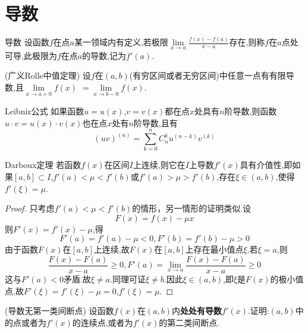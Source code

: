 \chapter{导数}

\begin{theorem}{导数} \label{thm:derivative}
	设函数$f$在点$a$某一领域内有定义,若极限$\lim\limits_{x\rightarrow a}\frac{f\left( x \right) -f\left( a \right)}{x-a}$存在,则称$f$在$a$点处可导,此极限为$f$在点$a$的导数,记为$f'\left( a \right) $.
\end{theorem}

\begin{example}{}
(广义Rolle中值定理) 设$f$在$\left( a,b \right) $(有穷区间或者无穷区间)中任意一点有有限导数,且$\lim\limits_{x\rightarrow a+0}f\left( x \right) $ $=\lim\limits_{x\rightarrow b-0}f\left( x \right) $.
\end{example}

\vspace{7cm}

\begin{theorem}{Leibniz公式} \label{thm:Leibniz_formula}
	如果函数$u=u\left( x \right)$,$v=v\left( x \right) $都在点$x$处具有$n$阶导数,则函数$u\cdot v=u\left( x \right) \cdot v\left( x \right) $也在点$x$处有$n$阶导数,且有
	$$
		\left( uv \right) ^{\left( n \right)}=\sum_{k=0}^n{C_{n}^{k}u^{\left( n-k \right)}v^{\left( k \right)}}
	$$
\end{theorem}

\begin{theorem}{Darboux定理} \label{thm:Darboux_theorem}
	若函数$f(x)$在区间$I$上连续,则它在$I$上导数$f'(x)$具有介值性,即如果$[a,b] \subset I$,$f'(a)< \mu<f'(b)$或$f'(a)> \mu>f'(b)$,存在$\xi \in (a,b)$,使得$f'(\xi)=\mu$.
\end{theorem}

\begin{proof}
	只考虑$f'(a)< \mu<f'(b)$的情形，另一情形的证明类似.设$$
		F\left( x \right) =f\left( x \right) -\mu x
	$$
	则$
		F'\left( x \right) =f'\left( x \right) -\mu
	$,得$$
		F'\left( a \right) =f'\left( a \right) -\mu <0,F'\left( b \right) =f'\left( b \right) -\mu >0
	$$由于函数$F(x)$在$[a,b]$上连续,故$F(x)$在$[a,b]$上存在最小值点$\xi$.若$\xi=a$,则$$
		\frac{F\left( x \right) -F\left( a \right)}{x-a}\ge 0,F'\left( a \right) =\lim_{x\rightarrow a}\frac{F\left( x \right) -F\left( a \right)}{x-a}\ge 0
	$$这与$F'(a)<0$矛盾.故$\xi\ne a$.同理可证$\xi\ne b$.因此$\xi \in (a,b)$,即$\xi$是$F(x)$的极小值点,故$F'(\xi)=f'(\xi)-\mu =0$,$f'(\xi)=\mu$.
\end{proof}

\begin{example}
(导数无第一类间断点) 设函数$f(x)$在$(a,b)$内\textbf{处处有导数}$f'(x)$.证明:$(a,b)$中的点或者为$f'(x)$的连续点,或者为$f'(x)$的第二类间断点.
\end{example}
